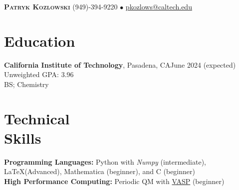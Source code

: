 \documentclass[margin,line]{resume}
\begin{document}
{\Large \textbf{\scshape Patryk Kozlowski}
\normalsize
\hspace{70mm}(949)-394-9220 $\bullet$ \url{pkozlows@caltech.edu}
}
\begin{resume}

\section{\mysidestyle Education}
\textbf{California Institute of Technology}, Pasadena, CA\hfill June 2024 (expected)\\
Unweighted GPA: 3.96\\
BS; Chemistry

\section{\mysidestyle Technical\\ Skills}
\textbf{Programming Languages:} Python with \emph{Numpy} (intermediate), \LaTeX  (Advanced), Mathematica (beginner), and C (beginner)\\
\textbf{High Performance Computing:} Periodic QM with \href{https://www.vasp.at/}{VASP} (beginner)


\end{resume}
\end{document}
